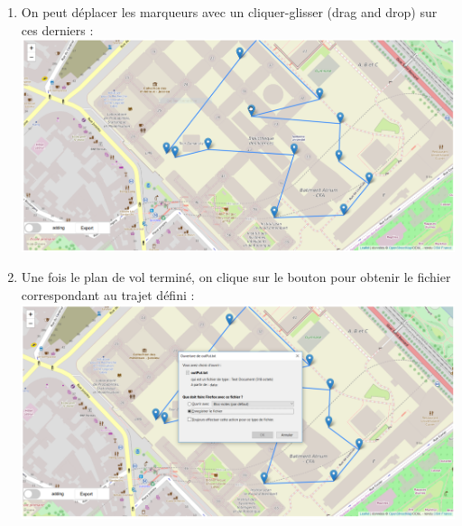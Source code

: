 \documentclass{article}
\begin{document}
\begin{enumerate}
 \item On peut déplacer les marqueurs avec un cliquer-glisser (drag and drop) sur ces derniers :\\
 \includegraphics[scale=0.42]{capt7.PNG}
  \item Une fois le plan de vol terminé, on clique sur le bouton pour obtenir le fichier correspondant au trajet défini :\\
 \includegraphics[scale=0.42]{capt8.PNG}

 \end{enumerate}
\end{document}
